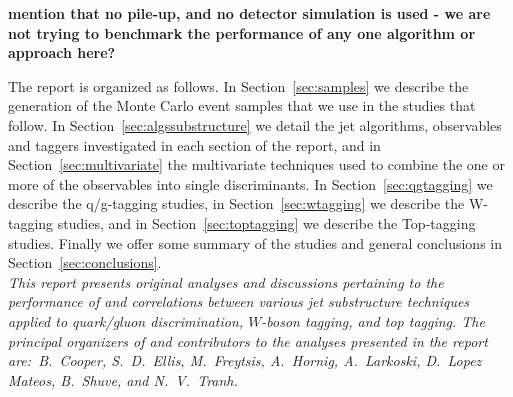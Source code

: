 {\bf mention that no pile-up, and no detector simulation is used - we are not trying to benchmark the performance of any one algorithm or approach here?}


The report is organized as follows. In Section~\ref{sec:samples} we describe the generation of the Monte Carlo event samples that we use in the studies that follow. In Section~\ref{sec:algssubstructure} we detail the jet algorithms, observables and taggers investigated in each section of the report, and in Section~\ref{sec:multivariate} the multivariate techniques used to combine the one or more of the observables into single discriminants. In Section~\ref{sec:qgtagging} we describe the q/g-tagging studies, in Section~\ref{sec:wtagging} we describe the W-tagging studies, and in Section~\ref{sec:toptagging} we describe the Top-tagging studies. Finally we offer some summary of the studies and general conclusions in Section~\ref{sec:conclusions}.\\

\emph{This report presents original analyses and discussions pertaining to the performance of and correlations between various jet substructure techniques applied to quark/gluon discrimination, $W$-boson tagging, and top tagging. The principal organizers of and contributors to the analyses presented in the report are:~B.~Cooper, S.~D.~Ellis, M.~Freytsis, A.~Hornig, A.~Larkoski, D.~Lopez Mateos, B.~Shuve, and N.~V.~Tranh.}